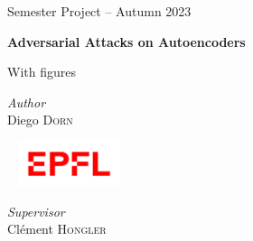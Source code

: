 \begin{titlepage}
\begin{center}
    \Large
    \textsf{Semester Project -- Autumn 2023}

    \vspace{1em}

    \textbf{\textsf{
        \Huge
        Adversarial Attacks on Autoencoders
    }}

    \begin{center}
        With  figures
    \end{center}


    \vfill

    \begin{center}
        \normalsize
    \end{center}

    \vfill


    \begin{minipage}{0.3\textwidth}
        \textit{Author} \\
        Diego \textsc{Dorn}
    \end{minipage}
    ~
    \includegraphics[width=3cm]{epfl.png}
    ~
    \begin{minipage}{0.3\textwidth}
        \begin{flushright}
            \textit{Supervisor} \\
            Clément \textsc{Hongler}
        \end{flushright}
    \end{minipage}
    \vspace{1cm}

    \vspace*{-3cm}
\end{center}
\end{titlepage}